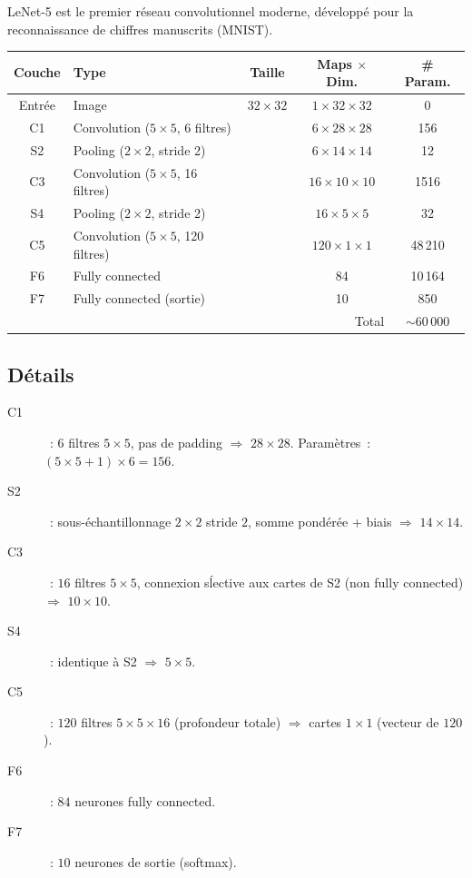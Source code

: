 \documentclass[a4paper,11pt]{article}
\theoremstyle{definition}
\theoremstyle{remark}
\begin{document}
LeNet-5 est le premier r\'eseau convolutionnel moderne, d\'evelopp\'e
pour la reconnaissance de chiffres manuscrits (MNIST).

\begin{center}
\begin{tabular}{clccc}
\toprule
Couche & Type & Taille & Maps $\times$ Dim. & \# Param. \\
\midrule
Entr\'ee & Image & $32\times 32$ & $1 \times 32 \times 32$ & 0 \\
C1 & Convolution ($5\times5$, 6 filtres) & & $6 \times 28 \times 28$ & 156 \\
S2 & Pooling ($2\times2$, stride 2) & & $6 \times 14 \times 14$ & 12 \\
C3 & Convolution ($5\times5$, 16 filtres) & & $16 \times 10 \times 10$ & 1516 \\
S4 & Pooling ($2\times2$, stride 2) & & $16 \times 5 \times 5$ & 32 \\
C5 & Convolution ($5\times5$, 120 filtres) & & $120 \times 1 \times 1$ & 48\,210 \\
F6 & Fully connected & & 84 & 10\,164 \\
F7 & Fully connected (sortie) & & 10 & 850 \\
\midrule
\multicolumn{4}{r}{Total} & $\sim$60\,000 \\
\bottomrule
\end{tabular}
\end{center}

\subsection{D\'etails}

\begin{description}
  \item[C1]~: $6$ filtres $5\times5$, pas de padding $\Rightarrow$
    $28\times28$. Param\`etres~: $(5\times5 + 1)\times 6 = 156$.
  \item[S2]~: sous-\'echantillonnage $2\times2$ stride $2$, somme
    pond\'er\'ee + biais $\Rightarrow$ $14\times14$.
  \item[C3]~: $16$ filtres $5\times5$, connexion s\'lective aux
    cartes de S2 (non fully connected) $\Rightarrow$ $10\times10$.
  \item[S4]~: identique \`a S2 $\Rightarrow$ $5\times5$.
  \item[C5]~: $120$ filtres $5\times5\times16$ (profondeur totale)
    $\Rightarrow$ cartes $1\times1$ (vecteur de $120$).
  \item[F6]~: $84$ neurones fully connected.
  \item[F7]~: $10$ neurones de sortie (softmax).
\end{description}
\end{document}
